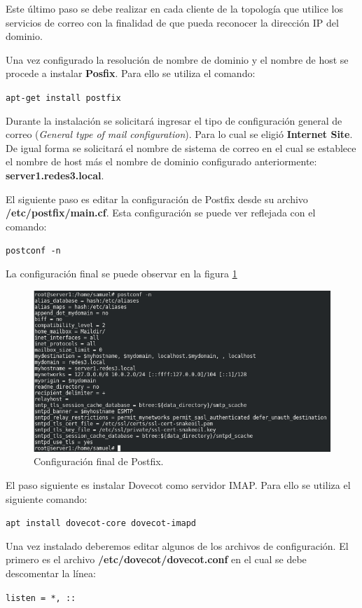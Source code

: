 Este último paso se debe realizar en cada cliente de la topología que utilice los servicios de correo con la finalidad de que pueda reconocer la dirección IP del dominio.

Una vez configurado la resolución de nombre de dominio y el nombre de host se procede a instalar \textbf{Posfix}. Para ello se utiliza el comando:

\texttt{apt-get install postfix}

Durante la instalación se solicitará ingresar el tipo de configuración general de correo (\textit{General type of mail configuration}). Para lo cual se eligió \textbf{Internet Site}.
De igual forma se solicitará el nombre de sistema de correo en el cual se establece el nombre de host más el nombre de dominio configurado anteriormente: \textbf{server1.redes3.local}.

El siguiente paso es editar la configuración de Postfix desde su archivo \textbf{/etc/postfix/main.cf}. Esta configuración se puede ver reflejada con el comando:

\texttt{postconf -n}

La configuración final se puede observar en la figura \ref{image:postconf}

\FloatBarrier
\begin{figure}[htbp!]
		\centering
			\includegraphics[width=.75 \textwidth]{images/postconf}
		\caption{Configuración final de Postfix.}
		\label{image:postconf}
\end{figure}
\FloatBarrier

El paso siguiente es instalar Dovecot como servidor IMAP. Para ello se utiliza el siguiente comando:

\texttt{apt install dovecot-core dovecot-imapd}

Una vez instalado deberemos editar algunos de los archivos de configuración. El primero es el archivo \textbf{/etc/dovecot/dovecot.conf} en el cual se debe descomentar la línea:

\texttt{listen = *, ::}

